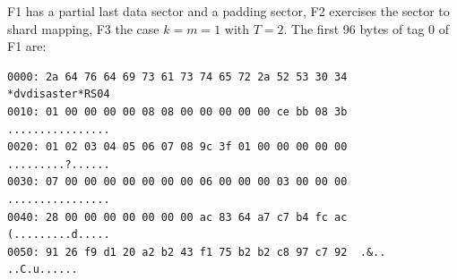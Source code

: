 F1 has a partial last data sector and a padding sector, F2 exercises the
sector to shard mapping, F3 the case $k = m = 1$ with $T = 2$. The first 96
bytes of tag 0 of F1 are:

{\footnotesize
\begin{verbatim}
0000: 2a 64 76 64 69 73 61 73 74 65 72 2a 52 53 30 34  *dvdisaster*RS04
0010: 01 00 00 00 00 08 08 00 00 00 00 00 ce bb 08 3b  ................
0020: 01 02 03 04 05 06 07 08 9c 3f 01 00 00 00 00 00  .........?......
0030: 07 00 00 00 00 00 00 00 06 00 00 00 03 00 00 00  ................
0040: 28 00 00 00 00 00 00 00 ac 83 64 a7 c7 b4 fc ac  (.........d.....
0050: 91 26 f9 d1 20 a2 b2 43 f1 75 b2 b2 c8 97 c7 92  .&.. ..C.u......
\end{verbatim}
}

\fussy
